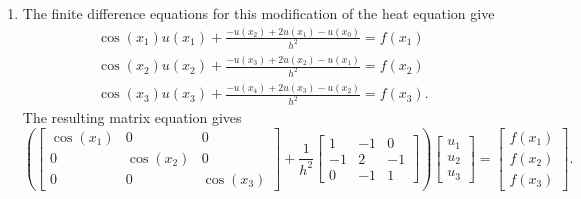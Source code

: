 {\begin{solution}
\begin{enumerate}
\[\begin{array}{ccc}
               -1 & 2 &  -1  \\
                 0 &   -1  & 1 
               \end{array}\right]
               \left[\begin{array}{c}
               1\\1\\1
               \end{array}\right]=
                                  \left[\begin{array}{c}
               4(1 - 1)\\ 4(-1 + 2 -1) \\ 4(1-1)
               \end{array}\right] = 
                                  \left[\begin{array}{c}
0\\0\\0
               \end{array}\right].
\]
This implies that the system matrix has a non-trivial nullspace, so that the solution to the finite difference matrix equation is non-unique.
\item The finite difference equations for this modification of the heat equation give
\begin{eqnarray*}
\cos(x_1) u(x_1) + \frac{-u(x_{2}) + 2u(x_1) - u(x_{0})}{h^2} =  f(x_1)\\
\cos(x_2) u(x_2) +\frac{-u(x_{3}) + 2u(x_2) - u(x_{1})}{h^2} =  f(x_2)\\
\cos(x_3) u(x_3) +\frac{-u(x_{4}) + 2u(x_3) - u(x_{2})}{h^2} =  f(x_3).
\end{eqnarray*}
The resulting matrix equation gives
\[
\left(\left[\begin{array}{ccc}
              \cos(x_1) &0 & 0 \\
               0 & \cos(x_2) &  0  \\
                 0 &   0  & \cos(x_3) 
               \end{array}\right] + \frac{1}{h^2}\left[\begin{array}{ccc}
              1 & -1&0 \\
               -1 & 2 &  -1  \\
                 0 &   -1  & 1 
               \end{array}\right]\right)
               \left[\begin{array}{c}
               u_1\\u_2\\u_3
               \end{array}\right] = 
                              \left[\begin{array}{c}
               f(x_1)\\f(x_2)\\f(x_3) 
               \end{array}\right].
\]

\end{enumerate}
\end{solution}
}{}
